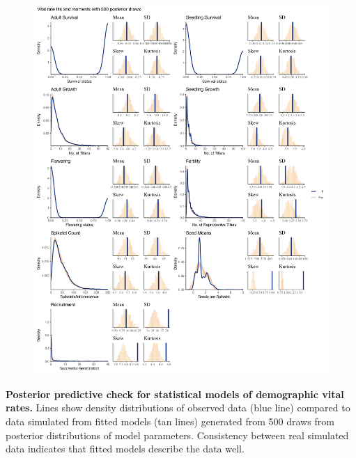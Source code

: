 \documentclass[12pt]{article}
\begin{document}
\begin{figure}
	\centering
	\includegraphics[width=.7\linewidth]{figS4_fitsandmoments_plot.png}
\end{figure}
 \textbf{Posterior predictive check for statistical models of demographic vital rates.} Lines show density distributions of observed data (blue line) compared to data simulated from fitted models (tan lines) generated from 500 draws from posterior distributions of model parameters. Consistency between real simulated data indicates that fitted models describe the data well.
\newpage
\end{document}
